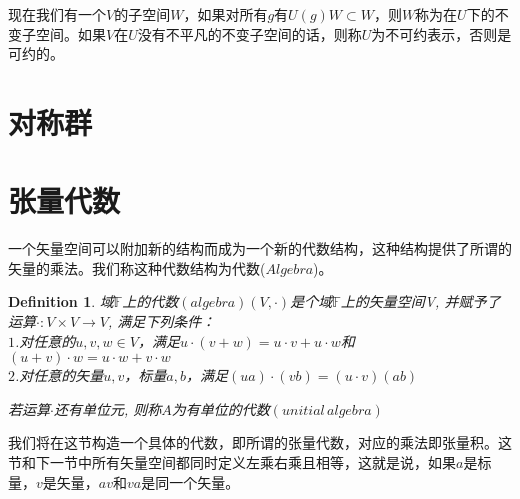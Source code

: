 \documentclass[11pt,a4paper,openany]{book}%
\theoremstyle{plain}%
\newtheorem{defi}{Definition}[chapter]%
\begin{document}
现在我们有一个$V$的子空间$W$，如果对所有$g$有$U(g)W\subset W$，则$W$称为在$U$下的不变子空间。如果$V$在$U$没有不平凡的不变子空间的话，则称$U$为不可约表示，否则是可约的。

\section{对称群}

\section{张量代数}
一个矢量空间可以附加新的结构而成为一个新的代数结构，这种结构提供了所谓的矢量的乘法。我们称这种代数结构为代数($Algebra$)。
\begin{defi}
域$\mathbb{F}$上的代数$(algebra)$$(V, \cdot)$是个域$\mathbb{F}$上的矢量空间V, 并赋予了运算$ \cdot: V \times V\rightarrow V$, 满足下列条件：\\
$1$.对任意的$u,v,w \in V$，满足$u\cdot (v+w) = u \cdot v+u\cdot w$和
$(u+v) \cdot w = u \cdot w+v\cdot w$\\
$2$.对任意的矢量$u,v$，标量$a,b$，满足$(ua)\cdot (vb)=(u\cdot v)(ab)$

若运算$\cdot$还有单位元, 则称$A$为有单位的代数$(unitial\,algebra)$
\end{defi}
我们将在这节构造一个具体的代数，即所谓的张量代数，对应的乘法即张量积。这节和下一节中所有矢量空间都同时定义左乘右乘且相等，这就是说，如果$a$是标量，$v$是矢量，$av$和$va$是同一个矢量。
\end{document}
